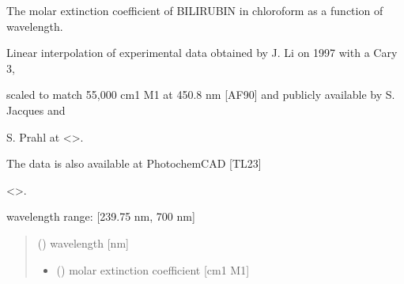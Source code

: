 \documentclass[letterpaper,10pt,english]{sphinxmanual}
\begin{document}
\begin{fulllineitems}
\label{\detokenize{03_absorption_coefficient:skinoptics.absorption_coefficient.molarext_bil_Li}}
\pysigstartsignatures
{}
\pysigstopsignatures
\begin{DUlineblock}{0em}
\item[] The molar extinction coefficient of BILIRUBIN in chloroform as a function of wavelength.
\item[] Linear interpolation of experimental data obtained by J. Li on 1997 with a Cary 3,
\item[] scaled to match 55,000 cm\sphinxhyphen{}1 M\sphinxhyphen{}1 at 450.8 nm {[}AF90{]} and publicly available by S. Jacques and
\item[] S. Prahl at \textless{}\textgreater{}.
\item[] The data is also available at PhotochemCAD {[}TL23{]}
\item[] \textless{}\textgreater{}.
\end{DUlineblock}

\begin{DUlineblock}{0em}
\item[] wavelength range: {[}239.75 nm, 700 nm{]}
\end{DUlineblock}
\begin{quote}\begin{description}
\sphinxAtStartPar
{} () \textendash{} wavelength {[}nm{]}

\sphinxAtStartPar
\begin{itemize}
\item {} 
\sphinxAtStartPar
{} () \textendash{} molar extinction coefficient {[}cm\sphinxhyphen{}1 M\sphinxhyphen{}1{]}

\end{itemize}


\end{description}\end{quote}

\end{fulllineitems}
\end{document}
